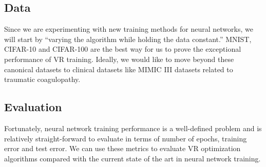 \documentclass{article} %
\begin{document}
\subsection{Data}
Since we are experimenting with new training methods for neural networks, we will start by ``varying the algorithm while holding the data constant.'' MNIST, CIFAR-10 and CIFAR-100 are the best way for us to prove the exceptional performance of VR training. Ideally, we would like to move beyond these canonical datasets to clinical datasets like MIMIC III \cite{mimiciii} datasets related to traumatic coagulopathy.

\subsection{Evaluation}
Fortunately, neural network training performance is a well-defined problem and is relatively straight-forward to evaluate in terms of number of epochs, training error and test error. We can use these metrics to evaluate VR optimization algorithms compared with the current state of the art in neural network training.




\end{document}
